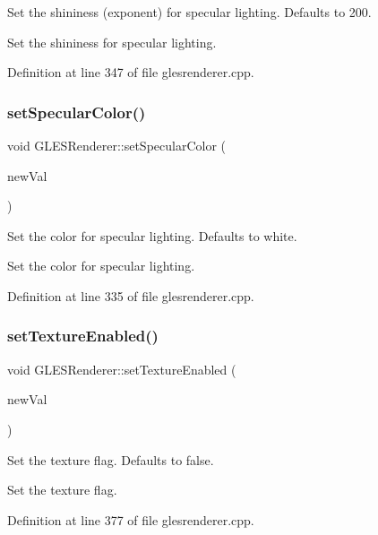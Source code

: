 Set the shininess (exponent) for specular lighting. Defaults to 200.

Set the shininess for specular lighting. 

Definition at line 347 of file glesrenderer.\+cpp.

\mbox{\label{class_g_l_e_s_renderer_a1ab28a7a363508c57024fbbd67c30481}} 
\subsubsection{\texorpdfstring{setSpecularColor()}{setSpecularColor()}}
{\footnotesize\ttfamily void G\+L\+E\+S\+Renderer\+::set\+Specular\+Color (\begin{DoxyParamCaption}\item[{const \mbox{\hyperlink{class_g_l_color_rgba}{G\+L\+Color\+Rgba}}}]{new\+Val }\end{DoxyParamCaption})}

Set the color for specular lighting. Defaults to white.

Set the color for specular lighting. 

Definition at line 335 of file glesrenderer.\+cpp.

\mbox{\label{class_g_l_e_s_renderer_a83f1e3ddcb613eea7e74fa6ce4289350}} 
\subsubsection{\texorpdfstring{setTextureEnabled()}{setTextureEnabled()}}
{\footnotesize\ttfamily void G\+L\+E\+S\+Renderer\+::set\+Texture\+Enabled (\begin{DoxyParamCaption}\item[{bool}]{new\+Val }\end{DoxyParamCaption})}

Set the texture flag. Defaults to false.

Set the texture flag. 

Definition at line 377 of file glesrenderer.\+cpp.

\mbox{\label{class_g_l_e_s_renderer_a9715cb674cb2fb4ae0cf13052f063336}} 
